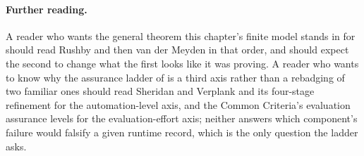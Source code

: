 \documentclass[11pt,a4paper]{article}
\theoremstyle{definition}
\begin{document}
\paragraph{Further reading.}
A reader who wants the general theorem this chapter's finite model stands in
for should read Rushby  and then van der Meyden
 in that order, and should expect the second to change what the
first looks like it was proving. A reader who wants to know why the assurance
ladder of  is a third axis rather than a
rebadging of two familiar ones should read Sheridan and Verplank
 and its four-stage refinement
 for the automation-level axis, and the Common
Criteria's evaluation assurance levels  for the
evaluation-effort axis; neither answers which component's failure would
falsify a given runtime record, which is the only question the ladder asks.

\pdprintsolutions
\end{document}
